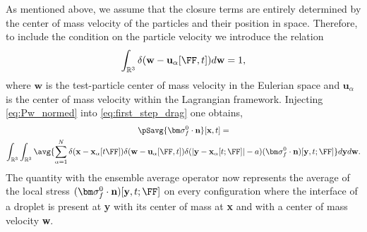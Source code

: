 As mentioned above, we assume that the closure terms are entirely determined by the center of mass velocity of the particles and their position in space. 
Therefore, to include the condition on the particle velocity we introduce the relation 
\begin{equation}
    \int_{\mathbb{R}^3} \delta(\textbf{w} - \textbf{u}_\alpha[\FF,t]) d\textbf{w} = 1,
    \label{eq:Pw_normed}
\end{equation}
where $\textbf{w}$ is the test-particle center of mass velocity in the Eulerian space and $\textbf{u}_\alpha$ is the center of mass velocity within the Lagrangian framework. 
Injecting \ref{eq:Pw_normed} into \ref{eq:first_step_drag} one obtains, 
\begin{multline}
    \pSavg{\bm\sigma_f^0\cdot\textbf{n}}[\textbf{x},t]
    = \\
    \int_{\mathbb{R}^3}
    \int_{\mathbb{R}^3}
    \avg{
     \sum_{\alpha=1}^N 
     \delta(\textbf{x}-\textbf{x}_\alpha[t \FF])
     \delta(\textbf{w} - \textbf{u}_\alpha[\FF,t])
    \delta(|\textbf{y} - \textbf{x}_{\alpha}[t;\FF]|-a)
    (\bm\sigma_f^0\cdot\textbf{n})[\textbf{y},t;\FF]
    }
    d\textbf{y}
    d\textbf{w}. 
    \label{eq:second_step_drag}
\end{multline}
The quantity with the ensemble average operator now represents the average of the local stress $(\bm\sigma_f^0\cdot\textbf{n})[\textbf{y},t;\FF]$ on every configuration where the interface of a droplet is present at \textbf{y} with its center of mass at \textbf{x} and with a center of mass velocity \textbf{w}.


